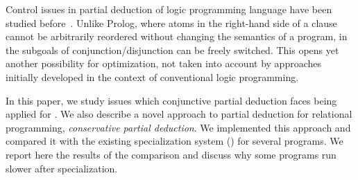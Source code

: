 Control issues in partial deduction of logic programming language \pro have been studied before~\cite{leuschel2002logic}.
Unlike Prolog, where atoms in the right-hand side of a clause cannot be arbitrarily reordered without changing the semantics of a program, in \mk the subgoals of conjunction/disjunction can be freely switched.
This opens yet another possibility for optimization, not taken into account by approaches initially developed in the context of conventional logic programming.

In this paper, we study issues which conjunctive partial deduction faces being applied for \mk.
We also describe a novel approach to partial deduction for relational programming, \emph{conservative partial deduction}.
We implemented this approach and compared it with the existing specialization system (\ecce) for several programs.
We report here the results of the comparison and discuss why some \mk programs run slower after specialization.

